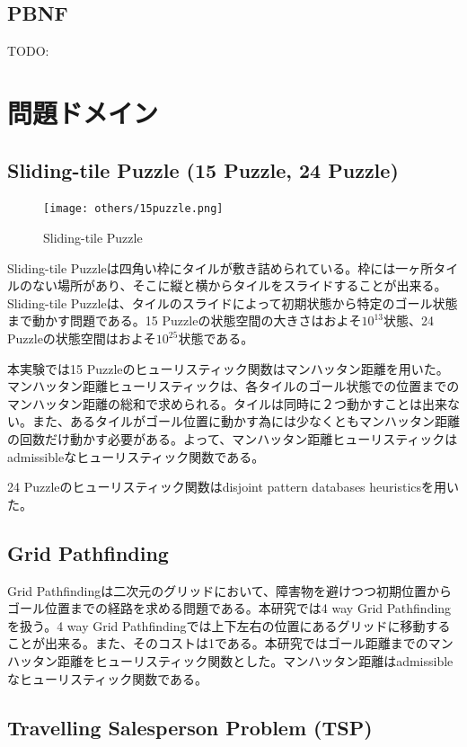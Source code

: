 \documentclass{jsarticle}
\begin{document}
\subsection{PBNF}

TODO: 

\section{問題ドメイン}
\subsection{Sliding-tile Puzzle (15 Puzzle, 24 Puzzle)}

\begin{figure}
	\centering
	\texttt{[image: others/15puzzle.png]}
	\label{fig:15puzzle}
	\caption{Sliding-tile Puzzle}
\end{figure}%

Sliding-tile Puzzleは四角い枠にタイルが敷き詰められている。枠には一ヶ所タイルのない場所があり、そこに縦と横からタイルをスライドすることが出来る。Sliding-tile Puzzleは、タイルのスライドによって初期状態から特定のゴール状態まで動かす問題である。15 Puzzleの状態空間の大きさはおよそ$10^{13}$状態、24 Puzzleの状態空間はおよそ$10^{25}$状態である。

本実験では15 Puzzleのヒューリスティック関数はマンハッタン距離を用いた。マンハッタン距離ヒューリスティックは、各タイルのゴール状態での位置までのマンハッタン距離の総和で求められる。タイルは同時に２つ動かすことは出来ない。また、あるタイルがゴール位置に動かす為には少なくともマンハッタン距離の回数だけ動かす必要がある。よって、マンハッタン距離ヒューリスティックはadmissibleなヒューリスティック関数である。

24 Puzzleのヒューリスティック関数はdisjoint pattern databases heuristicsを用いた。


\subsection{Grid Pathfinding}

Grid Pathfindingは二次元のグリッドにおいて、障害物を避けつつ初期位置からゴール位置までの経路を求める問題である。本研究では4 way Grid Pathfindingを扱う。4 way Grid Pathfindingでは上下左右の位置にあるグリッドに移動することが出来る。また、そのコストは1である。本研究ではゴール距離までのマンハッタン距離をヒューリスティック関数とした。マンハッタン距離はadmissibleなヒューリスティック関数である。

\subsection{Travelling Salesperson Problem (TSP)}
\end{document}
